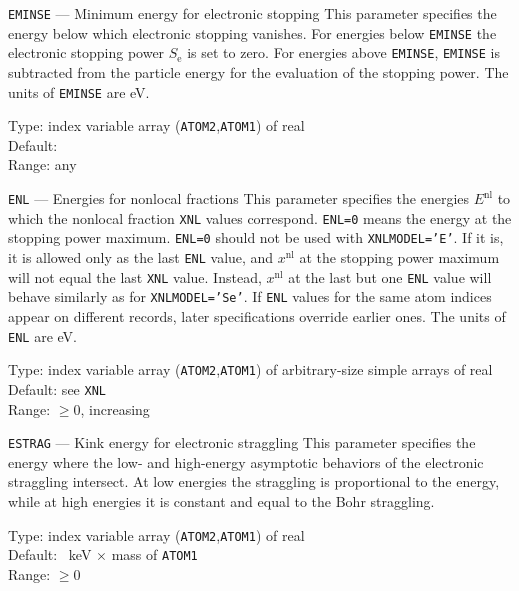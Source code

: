 \begin{keydescription}{\texttt{EMINSE} --- Minimum energy for electronic
    stopping}
%
  This parameter specifies the energy below which electronic stopping
  vanishes. For energies below \texttt{EMINSE} the electronic stopping
  power $S_\mathrm{e}$ is set to zero. For energies above \texttt{EMINSE},
  \texttt{EMINSE} is subtracted from the particle energy for the evaluation
  of the stopping power. The units of \texttt{EMINSE} are eV.
  \begin{keytab}
    Type:    \> index variable array (\texttt{ATOM2},\texttt{ATOM1}) 
                of real \\
    Default:  \\
    Range:   \> any
  \end{keytab}
\end{keydescription}

\begin{keydescription}{\texttt{ENL} --- Energies for nonlocal fractions}
%
  This parameter specifies the energies $E^\mathrm{nl}$ to which the
  nonlocal fraction \texttt{XNL} values correspond. \texttt{ENL=0} means 
  the energy at the stopping power maximum. \texttt{ENL=0} should not be 
  used with \texttt{XNLMODEL='E'}. If it is, it is allowed only as 
  the last \texttt{ENL} value, and $x^\mathrm{nl}$ at the stopping power
  maximum will not equal the last \texttt{XNL} value. Instead, $x^\mathrm{nl}$
  at the last but one \texttt{ENL} value will behave similarly as for 
  \texttt{XNLMODEL='Se'}. If \texttt{ENL} values for the same atom indices 
  appear on different records, later specifications override earlier ones.
  The units of \texttt{ENL} are eV.
  \begin{keytab}
    Type:    \> index variable array (\texttt{ATOM2},\texttt{ATOM1}) 
                of arbitrary-size simple arrays of real \\
    Default: \> see \texttt{XNL} \\
    Range:   \> $\ge 0$, increasing
  \end{keytab}
\end{keydescription}

\begin{keydescription}{\texttt{ESTRAG} --- Kink energy for electronic
    straggling}
%
  This parameter specifies the energy where the low- and high-energy
  asymptotic behaviors of the electronic straggling intersect. At low
  energies the straggling is proportional to the energy, while at high
  energies it is constant and equal to the Bohr straggling.
  \begin{keytab}
    Type:    \> index variable array (\texttt{ATOM2},\texttt{ATOM1}) 
                of real \\
    Default: ~keV $\times$ mass of \texttt{ATOM1} \\
    Range:   \> $\ge 0$
  \end{keytab}
\end{keydescription}

